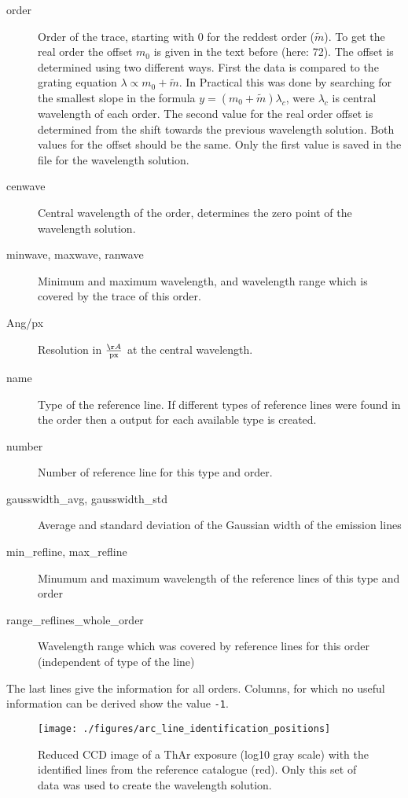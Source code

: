 \documentclass[10pt,a4paper]{article}
\begin{document}
\begin{description}
  \item[order] Order of the trace, starting with 0 for the reddest order ($\tilde{m}$). To get the real order the offset $m_0$ is given in the text before (here: 72). The offset is determined using two different ways. First the data is compared to the grating equation $\lambda \propto m_0 + \tilde{m}$. In Practical this was done by searching for the smallest slope in the formula $y = (m_0 + \tilde{m})\lambda_c$, were $\lambda_c$ is central wavelength of each order. The second value for the real order offset is determined from the shift towards the previous wavelength solution. Both values for the offset should be the same. Only the first value is saved in the file for the wavelength solution.
  \item[cenwave] Central wavelength of the order, determines the zero point of the wavelength solution.
  \item[minwave, maxwave, ranwave] Minimum and maximum wavelength, and wavelength range which is covered by the trace of this order.
  \item[Ang/px] Resolution in $\frac{\AA}{\mathrm{px}}$ at the central wavelength.
  \item[name] Type of the reference line. If different types of reference lines were found in the order then a output for each available type is created.
  \item[number] Number of reference line for this type and order.
  \item[gausswidth\_avg, gausswidth\_std] Average and standard deviation of the Gaussian width of the emission lines
  \item[min\_refline, max\_refline] Minumum and maximum wavelength of the reference lines of this type and order
  \item[range\_reflines\_whole\_order] Wavelength range which was covered by reference lines for this order (independent of type of the line)
\end{description}
The last lines give the information for all orders. Columns, for which no useful information can be derived show the value \verb|-1|.

\begin{figure} 
  \begin{center}
    \texttt{[image: ./figures/arc\_line\_identification\_positions]}
  \end{center} 
  \caption{Reduced CCD image of a ThAr exposure (log10 gray scale) with the identified lines from the reference catalogue (red). Only this set of data was used to create the wavelength solution.
    \label{figure_arc_line_identification_positions}}
\end{figure}
\end{document}
